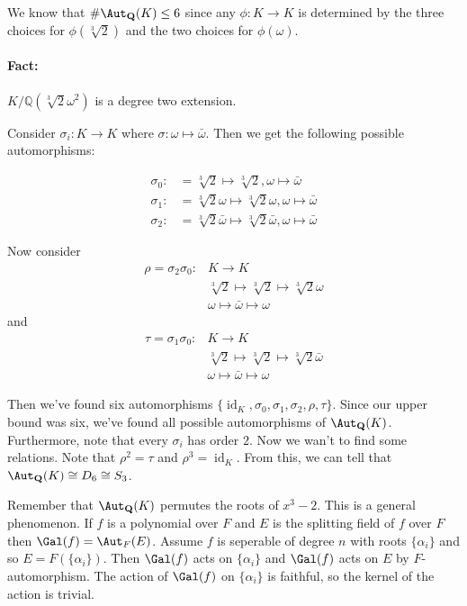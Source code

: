 We know that $\#\Aut_\mathbb{Q}(K) \leq 6$ since any $\phi\colon K \to K$ is determined by the three choices for $\phi(\sqrt[3]{2})$ and the two choices for $\phi(\omega)$.

\paragraph*{Fact:} $K/\mathbb{Q}(\sqrt[3]{2}\omega^2)$ is a degree two extension.

Consider $\sigma_i\colon K \to K$ where $\sigma\colon \omega \mapsto \bar{\omega}$. Then we get the following possible automorphisms:

\begin{align*}
	\sigma_0\colon &= \sqrt[3]{2} \mapsto \sqrt[3]{2}, \omega \mapsto \bar{\omega} \\
	\sigma_1\colon &= \sqrt[3]{2}\omega \mapsto \sqrt[3]{2}\omega, \omega \mapsto \bar{\omega} \\
	\sigma_2\colon &= \sqrt[3]{2}\bar{\omega} \mapsto \sqrt[3]{2}\bar{\omega}, \omega \mapsto \bar{\omega}
\end{align*}

Now consider 
\begin{align*}
	\rho = \sigma_2\sigma_0\colon &K \longrightarrow K \\
	                              & \sqrt[3]{2} \mapsto \sqrt[3]{2} \mapsto \sqrt[3]{2}\omega \\
	                              & \omega \mapsto \bar{\omega} \mapsto \omega
\end{align*}
and
\begin{align*}
	\tau = \sigma_1\sigma_0\colon &K \longrightarrow K \\
	                              & \sqrt[3]{2} \mapsto \sqrt[3]{2} \mapsto \sqrt[3]{2}\bar{\omega} \\
	                              & \omega \mapsto \bar{\omega} \mapsto \omega
\end{align*}

Then we've found six automorphisms $\{\operatorname{id}_K, \sigma_0, \sigma_1, \sigma_2, \rho, \tau\}$. Since our upper bound was six, we've found all possible automorphisms of $\Aut_\mathbb{Q}(K)$. Furthermore, note that every $\sigma_i$ has order $2$. Now we wan't to find some relations. Note that $\rho^2 = \tau$ and $\rho^3 = \operatorname{id}_K$. From this, we can tell that $\Aut_\mathbb{Q}(K) \cong D_6 \cong S_3$.

Remember that $\Aut_\mathbb{Q}(K)$ permutes the roots of $x^3 - 2$. This is a general phenomenon. If $f$ is a polynomial over $F$ and $E$ is the splitting field of $f$ over $F$ then $\Gal(f) = \Aut_F(E)$. Assume $f$ is seperable of degree $n$ with roots $\{\alpha_i\}$ and so $E = F(\{\alpha_i\})$. Then $\Gal(f)$ acts on $\{\alpha_i\}$ and $\Gal(f)$ acts on $E$ by $F$-automorphism. The action of $\Gal(f)$ on $\{\alpha_i\}$ is faithful, so the kernel of the action is trivial.

